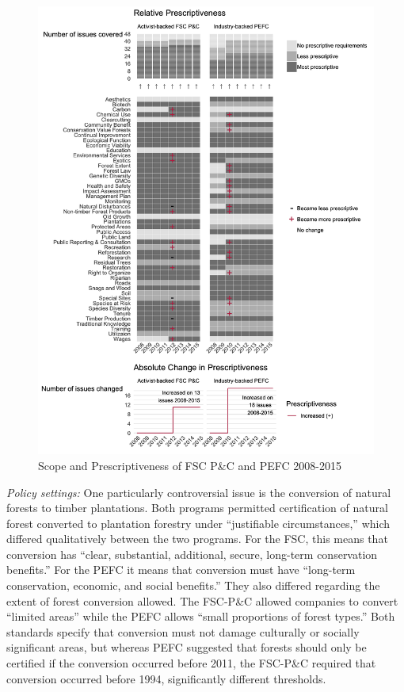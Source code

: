\documentclass[
      12pt,
            Review ]{article}
\begin{document}
\begin{figure}
\centering
\includegraphics{FSC-PEFC-1.png}
\caption{Scope and Prescriptiveness of FSC P\&C and PEFC 2008-2015}
\end{figure}

\emph{Policy settings:} One particularly controversial issue is the conversion of natural forests to timber plantations. Both programs permitted certification of natural forest converted to plantation forestry under ``justifiable circumstances,'' which differed qualitatively between the two programs. For the FSC, this means that conversion has ``clear, substantial, additional, secure, long-term conservation benefits.'' For the PEFC it means that conversion must have ``long-term conservation, economic, and social benefits.'' They also differed regarding the extent of forest conversion allowed. The FSC-P\&C allowed companies to convert ``limited areas'' while the PEFC allows ``small proportions of forest types.'' Both standards specify that conversion must not damage culturally or socially significant areas, but whereas PEFC suggested that forests should only be certified if the conversion occurred before 2011, the FSC-P\&C required that conversion occurred before 1994, significantly different thresholds.
\end{document}
